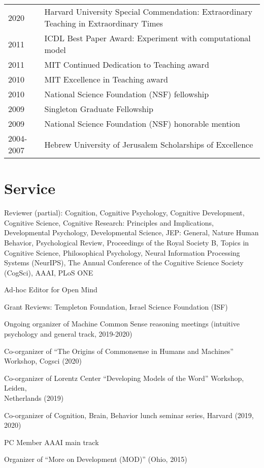 \documentclass[margin,line,pifont,palatino,courier]{res}
\begin{document}
\begin{resume}
\begin{tabular}{@{}p{0.8in}p{4in}}
2020 & Harvard University Special Commendation: Extraordinary Teaching in Extraordinary Times \\  
2011 & ICDL Best Paper Award: Experiment with computational model  \\
2011 & MIT Continued Dedication to Teaching award  \\
2010 & MIT Excellence in Teaching award  \\
2010 & National Science Foundation (NSF) fellowship\\
2009 & Singleton Graduate Fellowship \\
2009 & National Science Foundation (NSF) honorable mention\\
2004-2007 & Hebrew University of Jerusalem Scholarships of Excellence
\end{tabular}


\section{\sc Service}

Reviewer (partial): Cognition, Cognitive Psychology, Cognitive Development, Cognitive Science, Cognitive Research: Principles and Implications, Developmental Psychology, Developmental Science, JEP: General, Nature Human Behavior, Psychological Review, Proceedings of the Royal Society B, Topics in Cognitive Science, Philosophical Psychology, Neural Information Processing Systems (NeurIPS), The Annual Conference of the Cognitive Science Society (CogSci), AAAI, PLoS ONE

Ad-hoc Editor for Open Mind 

Grant Reviews: Templeton Foundation, Israel Science Foundation (ISF)

Ongoing organizer of Machine Common Sense reasoning meetings (intuitive psychology and general track, 2019-2020)

Co-organizer of ``The Origins of Commonsense in Humans and Machines'' Workshop, Cogsci (2020)

Co-organizer of Lorentz Center ``Developing Models of the Word'' Workshop, Leiden,\\
Netherlands (2019)

Co-organizer of Cognition, Brain, Behavior lunch seminar series, Harvard (2019, 2020)

PC Member AAAI main track

Organizer of ``More on Development (MOD)'' (Ohio, 2015)


\end{resume}
\end{document}
